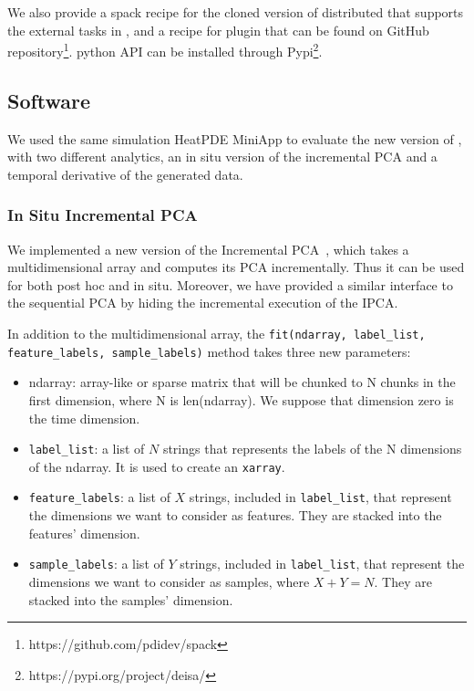We also provide a spack recipe for the cloned version of \dask distributed that supports the external tasks in \dask, and a recipe for \deisa plugin that can be found on GitHub repository\footnote{https://github.com/pdidev/spack}. \deisa python API can be installed through Pypi\footnote{https://pypi.org/project/deisa/}.  

\subsection{Software}
We used the same simulation HeatPDE MiniApp to evaluate the new version of \deisa, with two different analytics, an in situ version of the incremental PCA and a temporal derivative of the generated data.   

\subsubsection{In Situ Incremental PCA}\label{ISIPCA}

We implemented a new version of the Incremental PCA~\cite{IPCA}, which takes a multidimensional array and computes its PCA incrementally. Thus it can be used for both post hoc and in situ. 
Moreover, we have provided a similar interface to the sequential PCA by hiding the incremental execution of the IPCA.

In addition to the multidimensional array, the \texttt{fit(ndarray, label\_list, feature\_labels, sample\_labels)} method takes three new parameters:
\begin{itemize}
    \item ndarray: array-like or sparse matrix that will be chunked to N chunks in the first dimension, where N is len(ndarray). We suppose that dimension zero is the time dimension.
    \item \texttt{label\_list}: a list of $N$ strings that represents the labels of the N dimensions of the ndarray. It is used to create an \texttt{xarray}.
    \item \texttt{feature\_labels}: a list of $X$ strings, included in \texttt{label\_list}, that represent the dimensions we want to consider as features. They are stacked into the features' dimension. 
    \item  \texttt{sample\_labels}: a list of $Y$ strings, included in \texttt{label\_list}, that represent the dimensions we want to consider as samples, where $X+Y=N$. They are stacked into the samples' dimension.
\end{itemize}

